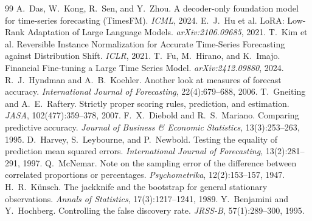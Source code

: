 \documentclass[11pt]{article}
\begin{document}
\begin{thebibliography}{99}
 A.~Das, W.~Kong, R.~Sen, and Y.~Zhou.
A decoder-only foundation model for time-series forecasting (TimesFM). \emph{ICML}, 2024.
 E.~J.~Hu et al. LoRA: Low-Rank Adaptation of Large Language Models.
\emph{arXiv:2106.09685}, 2021.
 T.~Kim et al. Reversible Instance Normalization for Accurate
Time-Series Forecasting against Distribution Shift. \emph{ICLR}, 2021.
 T.~Fu, M.~Hirano, and K.~Imajo. Financial Fine-tuning a Large
Time Series Model. \emph{arXiv:2412.09880}, 2024.
 R.~J.~Hyndman and A.~B.~Koehler. Another look at measures of
forecast accuracy. \emph{International Journal of Forecasting}, 22(4):679--688, 2006.
 T.~Gneiting and A.~E.~Raftery. Strictly proper scoring
rules, prediction, and estimation. \emph{JASA}, 102(477):359--378, 2007.
 F.~X.~Diebold and R.~S.~Mariano. Comparing predictive
accuracy. \emph{Journal of Business \& Economic Statistics}, 13(3):253--263, 1995.
 D.~Harvey, S.~Leybourne, and P.~Newbold. Testing the equality
of prediction mean squared errors. \emph{International Journal of Forecasting}, 13(2):281--291, 1997.
 Q.~McNemar. Note on the sampling error of the difference between
correlated proportions or percentages. \emph{Psychometrika}, 12(2):153--157, 1947.
 H.~R.~K\"unsch. The jackknife and the bootstrap for general
stationary observations. \emph{Annals of Statistics}, 17(3):1217--1241, 1989.
 Y.~Benjamini and Y.~Hochberg. Controlling the false
discovery rate. \emph{JRSS-B}, 57(1):289--300, 1995.
\end{thebibliography}
\end{document}
